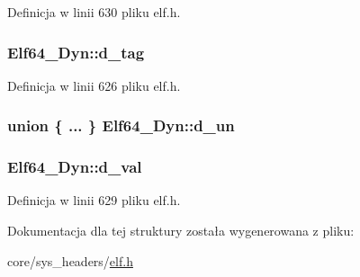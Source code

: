 Definicja w linii 630 pliku elf.\-h.

\hypertarget{struct_elf64___dyn_a74a63e5acb7d8ddc946a5b0c5eb3c26a}{
\subsubsection[{d\-\_\-tag}]{ Elf64\-\_\-\-Dyn\-::d\-\_\-tag}}\label{struct_elf64___dyn_a74a63e5acb7d8ddc946a5b0c5eb3c26a}


Definicja w linii 626 pliku elf.\-h.

\hypertarget{struct_elf64___dyn_acc39d52f3a8efd552afa2e3369c03215}{
\subsubsection[{d\-\_\-un}]{\setlength{\rightskip}{0pt plus 5cm}union \{ ... \}   Elf64\-\_\-\-Dyn\-::d\-\_\-un}}\label{struct_elf64___dyn_acc39d52f3a8efd552afa2e3369c03215}
\hypertarget{struct_elf64___dyn_ab1741378fc34cbcc8caf3f7bb5e6de18}{
\subsubsection[{d\-\_\-val}]{ Elf64\-\_\-\-Dyn\-::d\-\_\-val}}\label{struct_elf64___dyn_ab1741378fc34cbcc8caf3f7bb5e6de18}


Definicja w linii 629 pliku elf.\-h.



Dokumentacja dla tej struktury została wygenerowana z pliku\-:\begin{DoxyCompactItemize}
\item 
core/sys\-\_\-headers/\hyperlink{elf_8h}{elf.\-h}\end{DoxyCompactItemize}
